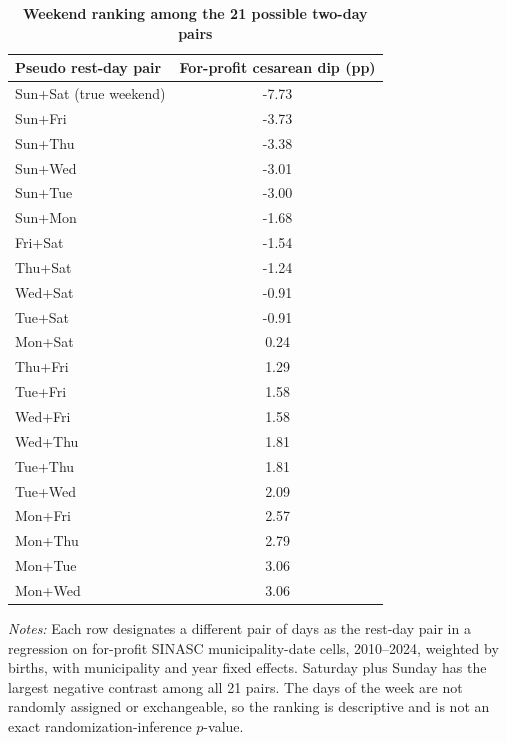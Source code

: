 \begin{table}[H]\centering
\caption{\textbf{Weekend ranking among the 21 possible two-day pairs}}
\label{tab:permutation}\small
\begin{tabular}{lc}
\toprule
Pseudo rest-day pair & For-profit cesarean dip (pp) \\
\midrule
Sun+Sat (true weekend) & -7.73 \\
Sun+Fri & -3.73 \\
Sun+Thu & -3.38 \\
Sun+Wed & -3.01 \\
Sun+Tue & -3.00 \\
Sun+Mon & -1.68 \\
Fri+Sat & -1.54 \\
Thu+Sat & -1.24 \\
Wed+Sat & -0.91 \\
Tue+Sat & -0.91 \\
Mon+Sat & 0.24 \\
Thu+Fri & 1.29 \\
Tue+Fri & 1.58 \\
Wed+Fri & 1.58 \\
Wed+Thu & 1.81 \\
Tue+Thu & 1.81 \\
Tue+Wed & 2.09 \\
Mon+Fri & 2.57 \\
Mon+Thu & 2.79 \\
Mon+Tue & 3.06 \\
Mon+Wed & 3.06 \\
\bottomrule
\end{tabular}
\begin{minipage}{\linewidth}\footnotesize
\textit{Notes:} Each row designates a different pair of days as the rest-day pair in a regression on for-profit SINASC municipality-date cells, 2010--2024, weighted by births, with municipality and year fixed effects. Saturday plus Sunday has the largest negative contrast among all 21 pairs. The days of the week are not randomly assigned or exchangeable, so the ranking is descriptive and is not an exact randomization-inference $p$-value.
\end{minipage}
\end{table}

